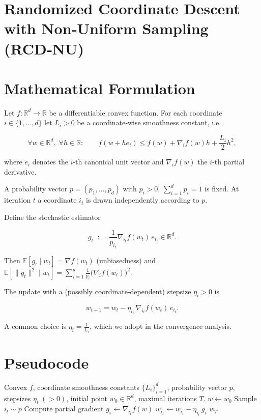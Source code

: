 \documentclass{article}
\newcommand{\E}{\mathbb{E}}
\newcommand{\R}{\mathbb{R}}
\begin{document}
\section*{Randomized Coordinate Descent with Non‑Uniform Sampling (RCD‑NU)}

\section*{Mathematical Formulation}
Let $f:\R^{d}\to\R$ be a differentiable convex function.  
For each coordinate $i\in\{1,\dots ,d\}$ let $L_i>0$ be a coordinate‑wise smoothness constant, i.e.

\[
\forall w\in\R^{d},\;\forall h\in\R:\qquad
f(w+ h e_i)\le f(w)+\nabla_i f(w)h+\frac{L_i}{2}h^{2},
\tag{1}
\]

where $e_i$ denotes the $i$‑th canonical unit vector and $\nabla_i f(w)$ the $i$‑th partial derivative.

A probability vector $p=(p_1,\dots ,p_d)$ with $p_i>0$, $\sum_{i=1}^{d}p_i=1$ is fixed.  
At iteration $t$ a coordinate $i_t$ is drawn independently according to $p$.

Define the stochastic estimator

\[
g_t\;:=\;\frac{1}{p_{i_t}}\nabla_{i_t}f(w_t)\,e_{i_t}\in\R^{d}.
\tag{2}
\]

Then $\E[g_t\mid w_t]=\nabla f(w_t)$ (unbiasedness) and  
$\E\!\left[\|g_t\|^{2}\mid w_t\right]=\sum_{i=1}^{d}\frac{1}{p_i}\bigl(\nabla_i f(w_t)\bigr)^{2}$.

The update with a (possibly coordinate‑dependent) stepsize $\eta_i>0$ is

\[
w_{t+1}=w_t-\eta_{i_t}\,\nabla_{i_t}f(w_t)\,e_{i_t}.
\tag{3}
\]

A common choice is $\eta_i = \frac{1}{L_i}$, which we adopt in the convergence analysis.

\section*{Pseudocode}
\begin{algorithm}[H]
\caption{Randomized Coordinate Descent (non‑uniform)}\label{alg:rcd}
\begin{algorithmic}[1]
\Require Convex $f$, coordinate smoothness constants $\{L_i\}_{i=1}^{d}$, probability vector $p$, stepsizes $\eta_i\;(>0)$, initial point $w_0\in\R^{d}$, maximal iterations $T$.
\State $w\gets w_0$
    \State Sample $i_t\sim p$ 
    \State Compute partial gradient $g_i\gets \nabla_{i_t}f(w)$
    \State $w_{i_t}\gets w_{i_t}-\eta_{i_t}\,g_i$ 
\EndFor
\State \Return $w_T$
\end{algorithmic}
\end{algorithm}
\end{document}
